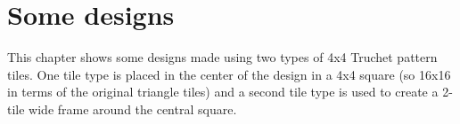 \documentclass{tufte-book}
\begin{document}


\chapter{Some designs}
This chapter shows some designs made using two types of 4x4 Truchet pattern tiles. One tile type is placed in the center of the design in a 4x4 square (so 16x16 in terms of the original triangle tiles) and a second tile type is used to create a 2-tile wide frame around the central square.

{
\setlength{\tabcolsep}{0pt}
\renewcommand{\arraystretch}{0}

}

\backmatter
\nocite{*}


\end{document}
